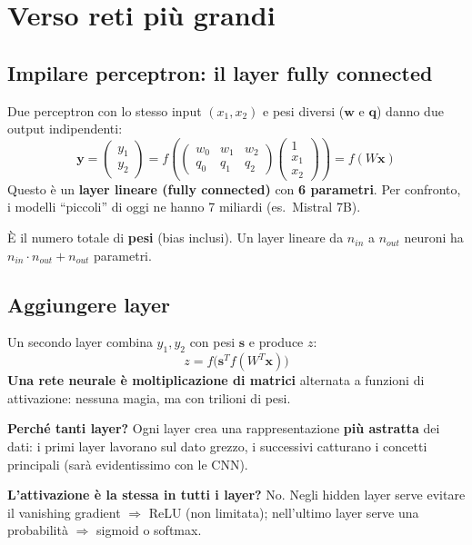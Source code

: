 \section{Verso reti più grandi}
\subsection{Impilare perceptron: il layer fully connected}
Due perceptron con lo stesso input $(x_1,x_2)$ e pesi diversi ($\mathbf{w}$ e $\mathbf{q}$) danno due output indipendenti:
\[
\mathbf{y} = \begin{pmatrix} y_1\\ y_2\end{pmatrix}
= f\left(\begin{pmatrix} w_0 & w_1 & w_2\\ q_0 & q_1 & q_2\end{pmatrix}
\begin{pmatrix} 1\\ x_1\\ x_2\end{pmatrix}\right) = f(W\mathbf{x})
\]
Questo è un \textbf{layer lineare (fully connected)} con \textbf{6 parametri}. Per confronto, i modelli ``piccoli''
di oggi ne hanno 7 miliardi (es.\ Mistral 7B).

\begin{definizione}
È il numero totale di \textbf{pesi} (bias inclusi). Un layer lineare da $n_{in}$ a $n_{out}$ neuroni ha
$n_{in} \cdot n_{out} + n_{out}$ parametri.
\end{definizione}

\subsection{Aggiungere layer}
Un secondo layer combina $y_1, y_2$ con pesi $\mathbf{s}$ e produce $z$:
\[
z = f\big(\mathbf{s}^T f(W^T\mathbf{x})\big)
\]
\textbf{Una rete neurale è moltiplicazione di matrici} alternata a funzioni di attivazione: nessuna magia, ma con
trilioni di pesi.

\textbf{Perché tanti layer?} Ogni layer crea una rappresentazione \textbf{più astratta} dei dati: i primi layer
lavorano sul dato grezzo, i successivi catturano i concetti principali (sarà evidentissimo con le CNN).

\textbf{L'attivazione è la stessa in tutti i layer?} No. Negli hidden layer serve evitare il vanishing gradient
$\Rightarrow$ ReLU (non limitata); nell'ultimo layer serve una probabilità $\Rightarrow$ sigmoid o softmax.

